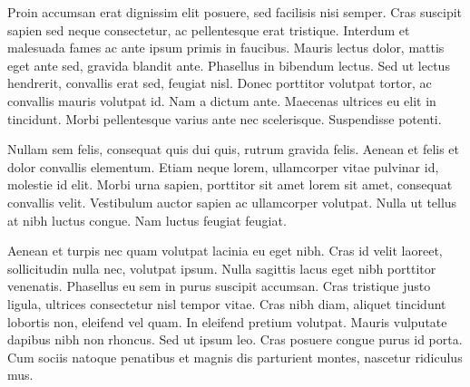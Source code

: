 Proin accumsan erat dignissim elit posuere, sed facilisis nisi semper. Cras suscipit sapien sed neque consectetur, ac pellentesque erat tristique. Interdum et malesuada fames ac ante ipsum primis in faucibus. Mauris lectus dolor, mattis eget ante sed, gravida blandit ante. Phasellus in bibendum lectus. Sed ut lectus hendrerit, convallis erat sed, feugiat nisl. Donec porttitor volutpat tortor, ac convallis mauris volutpat id. Nam a dictum ante. Maecenas ultrices eu elit in tincidunt. Morbi pellentesque varius ante nec scelerisque. Suspendisse potenti.

Nullam sem felis, consequat quis dui quis, rutrum gravida felis. Aenean et felis et dolor convallis elementum. Etiam neque lorem, ullamcorper vitae pulvinar id, molestie id elit. Morbi urna sapien, porttitor sit amet lorem sit amet, consequat convallis velit. Vestibulum auctor sapien ac ullamcorper volutpat. Nulla ut tellus at nibh luctus congue. Nam luctus feugiat feugiat.

Aenean et turpis nec quam volutpat lacinia eu eget nibh. Cras id velit laoreet, sollicitudin nulla nec, volutpat ipsum. Nulla sagittis lacus eget nibh porttitor venenatis. Phasellus eu sem in purus suscipit accumsan. Cras tristique justo ligula, ultrices consectetur nisl tempor vitae. Cras nibh diam, aliquet tincidunt lobortis non, eleifend vel quam. In eleifend pretium volutpat. Mauris vulputate dapibus nibh non rhoncus. Sed ut ipsum leo. Cras posuere congue purus id porta. Cum sociis natoque penatibus et magnis dis parturient montes, nascetur ridiculus mus.